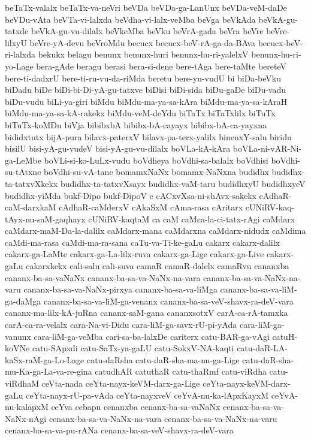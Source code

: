 {beTaTx-valalx
beTaTx-va-neVri
beVDa
beVDa-ga-LanUnx
beVDa-veM-daDe
beVDu-vAta
beVTa-vi-lalxda
beVdha-vi-lalx-veMba
beVga
beVkAda
beVkA-gu-tatxde
beVkA-gu-vu-dilalx
beVkeMba
beVku
beVrA-gada
beVra
beVre
beVre-lilxyU
beVre-yA-devu
beVroMdu
becucx
becucx-beV-rA-ga-da-BAva
becucx-beV-ri-lalxda
bekukx
belagu
benunx
benunx-huri
benunx-hu-ri-yalelxV
benunx-hu-ri-yo-Lage
bera-gAde
beragu
berasi
bera-si-dene
bere-tAga
bere-taMte
bereteV
bere-ti-dadxrU
bere-ti-ru-vu-da-riMda
beretu
bere-yu-vudU
bi
biDa-beVku
biDadu
biDe
biDi-bi-Di-yA-gu-tatxve
biDisi
biDi-sida
biDu-gaDe
biDu-vadu
biDu-vudu
biLi-ya-giri
biMdu
biMdu-ma-ya-sa-kAra
biMdu-ma-ya-sa-kAraH
biMdu-ma-ya-sa-kA-rakekx
biMdu-veM-deYdu
biTaTx
biTaTxlilx
biTuTx
biTuTx-koMDu
biVja
bibibxbA
bibibx-bA-cayayx
bibibx-bA-ca-yayxna
bididxtutx
bijA-pura
bilavx-paterxV
bilavx-pa-terx-yalilx
binenxY-salu
biridu
bisilU
bisi-yA-gu-vudeV
bisi-yA-gu-vu-dilalx
boVLa-kA-kAra
boVLa-ni-vAR-Ni-ga-LeMbe
boVLi-si-ko-LuLx-vudu
boVdheya
boVdhi-sa-balalx
boVdhisi
boVdhi-su-tAtxne
boVdhi-su-vA-tane
bomamxNaNx
bomamx-NaNxna
budidhx
budidhx-ta-tatxvXkekx
budidhx-ta-tatxvXsayx
budidhx-vaM-taru
budidhxyU
budidhxyeV
budidhx-yiMda
bukf-Dipo
bukf-DipoV
c
cACxvXsa-ni-shAvx-sakekx
cAdhaR-caM-darxkaM
cAdhaR-caMderxV
cAkaSxM
cAma-rasa
cAritarx
cUNiRV-kaq-tAyx-nu-saM-gaqhayx
cUNiRV-kaqtaM
ca
caM
caMca-la-ci-tatx-rAgi
caMdarx
caMdarx-maM-Da-la-dalilx
caMdarx-mana
caMdarxna
caMdarx-nidudx
caMdima
caMdi-ma-rasa
caMdi-ma-ra-sana
caTu-va-Ti-ke-gaLu
cakarx
cakarx-dalilx
cakarx-ga-LaMte
cakarx-ga-La-lilx-ruva
cakarx-ga-Lige
cakarx-ga-Live
cakarx-gaLu
cakarxkekx
cali-salu
cali-suva
camaR
camaR-dalelx
camaRvu
cananxba
cananx-ba-sa-vaNaNx
cananx-ba-sa-va-NaNx-na-vara
cananx-ba-sa-va-NaNx-na-varu
cananx-ba-sa-va-NaNx-pirxya
cananx-ba-sa-va-liMga
cananx-ba-sa-va-liM-ga-daMga
cananx-ba-sa-va-liM-ga-venanx
cananx-ba-sa-veV-shavx-ra-deV-vara
cananx-ma-lilx-kA-juRna
cananx-saM-gana
cananxsotxV
carA-ca-rA-tamxka
carA-ca-ra-velalx
cara-Na-vi-Didu
cara-liM-ga-savx-rU-pi-yAda
cara-liM-ga-vanunx
cara-liM-ga-veMba
cari-sa-ba-lalxDe
cariterx
catu-BAR-ga-vAgi
catuH-koVNe
catu-SApxdi
catu-SaTx-ya-gaLU
catu-SokxV-NA-kaqti
catu-daR-LA-kaSx-raM-ga-Lo-Lage
catu-daRsha
catu-daR-sha-ma-nu-ga-Lige
catu-daR-sha-mu-Ka-ga-La-va-re-gina
catudhAR
catuthaR
catu-thaRmf
catu-viRdha
catu-viRdhaM
ceVta-nada
ceYta-nayx-keVM-darx-ga-Lige
ceYta-nayx-keVM-darx-gaLu
ceYta-nayx-rU-pa-vAda
ceYta-nayxveV
ceYvA-nu-ka-lApxKayxM
ceYvA-nu-kalapxM
ceYva
cebapu
cenanxba
cenanx-ba-sa-vaNaNx
cenanx-ba-sa-va-NaNx-nAgi
cenanx-ba-sa-va-NaNx-na-vara
cenanx-ba-sa-va-NaNx-na-varu
cenanx-ba-sa-va-pu-rANa
cenanx-ba-sa-veV-shavx-ra-deV-vara
}
